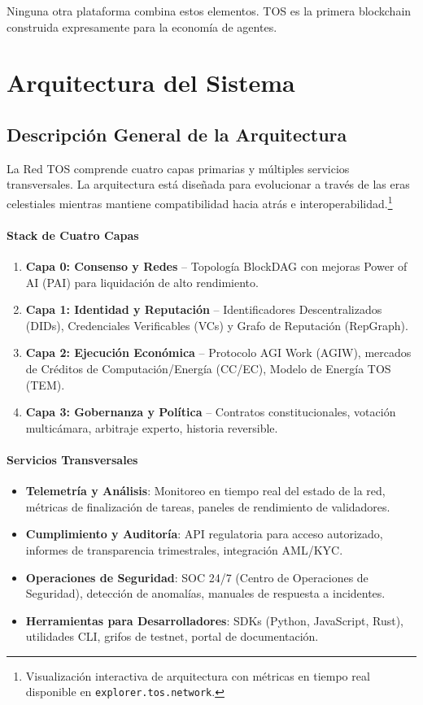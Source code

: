 \documentclass[11pt]{article}
\begin{document}
Ninguna otra plataforma combina estos elementos. TOS es la primera blockchain construida expresamente para la economía de agentes.

\section{Arquitectura del Sistema}
\subsection{Descripción General de la Arquitectura}
La Red TOS comprende cuatro capas primarias y múltiples servicios transversales. La arquitectura está diseñada para evolucionar a través de las eras celestiales mientras mantiene compatibilidad hacia atrás e interoperabilidad.\footnote{Visualización interactiva de arquitectura con métricas en tiempo real disponible en \texttt{explorer.tos.network}.}

\paragraph{Stack de Cuatro Capas}
\begin{enumerate}[noitemsep]
  \item \textbf{Capa 0: Consenso y Redes} -- Topología BlockDAG con mejoras Power of AI (PAI) para liquidación de alto rendimiento.
  \item \textbf{Capa 1: Identidad y Reputación} -- Identificadores Descentralizados (DIDs), Credenciales Verificables (VCs) y Grafo de Reputación (RepGraph).
  \item \textbf{Capa 2: Ejecución Económica} -- Protocolo AGI Work (AGIW), mercados de Créditos de Computación/Energía (CC/EC), Modelo de Energía TOS (TEM).
  \item \textbf{Capa 3: Gobernanza y Política} -- Contratos constitucionales, votación multicámara, arbitraje experto, historia reversible.
\end{enumerate}

\paragraph{Servicios Transversales}
\begin{itemize}[noitemsep]
  \item \textbf{Telemetría y Análisis}: Monitoreo en tiempo real del estado de la red, métricas de finalización de tareas, paneles de rendimiento de validadores.
  \item \textbf{Cumplimiento y Auditoría}: API regulatoria para acceso autorizado, informes de transparencia trimestrales, integración AML/KYC.
  \item \textbf{Operaciones de Seguridad}: SOC 24/7 (Centro de Operaciones de Seguridad), detección de anomalías, manuales de respuesta a incidentes.
  \item \textbf{Herramientas para Desarrolladores}: SDKs (Python, JavaScript, Rust), utilidades CLI, grifos de testnet, portal de documentación.
\end{itemize}
\end{document}
